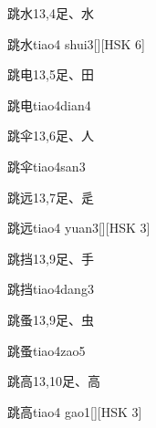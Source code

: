 \begin{Entry}{跳水}{13,4}{⾜、⽔}
  \begin{Phonetics}{跳水}{tiao4 shui3}[][HSK 6]
  \end{Phonetics}
\end{Entry}

\begin{Entry}{跳电}{13,5}{⾜、⽥}
  \begin{Phonetics}{跳电}{tiao4dian4}
  \end{Phonetics}
\end{Entry}

\begin{Entry}{跳伞}{13,6}{⾜、⼈}
  \begin{Phonetics}{跳伞}{tiao4san3}
  \end{Phonetics}
\end{Entry}

\begin{Entry}{跳远}{13,7}{⾜、⾡}
  \begin{Phonetics}{跳远}{tiao4 yuan3}[][HSK 3]
  \end{Phonetics}
\end{Entry}

\begin{Entry}{跳挡}{13,9}{⾜、⼿}
  \begin{Phonetics}{跳挡}{tiao4dang3}
  \end{Phonetics}
\end{Entry}

\begin{Entry}{跳蚤}{13,9}{⾜、⾍}
  \begin{Phonetics}{跳蚤}{tiao4zao5}
  \end{Phonetics}
\end{Entry}

\begin{Entry}{跳高}{13,10}{⾜、⾼}
  \begin{Phonetics}{跳高}{tiao4 gao1}[][HSK 3]
  \end{Phonetics}
\end{Entry}

